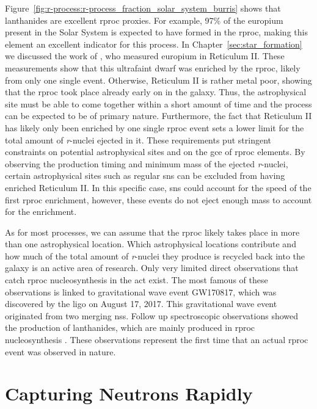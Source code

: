 Figure~\ref{fig:r-process:r-process_fraction_solar_system_burris} shows that lanthanides are excellent \ac{rproc} proxies. For example, 97\% of the europium present in the Solar System is expected to have formed in the \ac{rproc}, making this element an excellent indicator for this process. In Chapter~\ref{sec:star_formation} we discussed the work of \citet{ji16}, who measured europium in Reticulum II. These measurements show that this ultrafaint dwarf was enriched by the \ac{rproc}, likely from only one single event. Otherwise, Reticulum II is rather metal poor, showing that the \ac{rproc} took place already early on in the galaxy. Thus, the astrophysical site must be able to come together within a short amount of time and the process can be expected to be of primary nature. Furthermore, the fact that Reticulum II has likely only been enriched by one single \ac{rproc} event sets a lower limit for the total amount of \textit{r}-nuclei ejected in it. These requirements put stringent constraints on potential astrophysical sites and on the \ac{gce} of \ac{rproc} elements. By observing the production timing and minimum mass of the ejected \textit{r}-nuclei, certain astrophysical sites such as regular \acp{sn} can be excluded from having enriched Reticulum II. In this specific case, \acp{sn} could account for the speed of the first \ac{rproc} enrichment, however, these events do not eject enough mass to account for the enrichment. 

As for most processes, we can assume that the \ac{rproc} likely takes place in more than one astrophysical location. Which astrophysical locations contribute and how much of the total amount of \textit{r}-nuclei they produce is recycled back into the galaxy is an active area of research. Only very limited direct observations that catch \ac{rproc} nucleosynthesis in the act exist. The most famous of these observations is linked to gravitational wave event GW170817, which was discovered by the \acf{ligo} on August 17, 2017. This gravitational wave event originated from two merging \acfp{ns}. Follow up spectroscopic observations showed the production of lanthanides, which are mainly produced in \ac{rproc} nucleosynthesis \citep{pian17}. These observations represent the first time that an actual \ac{rproc} event was observed in nature.


\section{Capturing Neutrons Rapidly}

